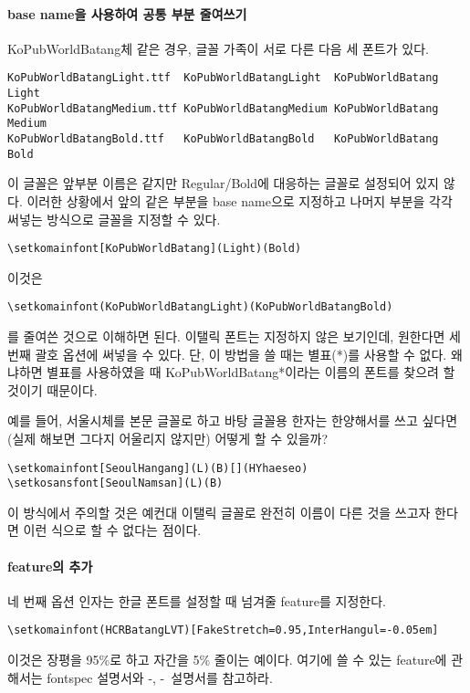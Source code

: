 \documentclass[
	12pt,
	a4paper,
	kosection,
	footnote,
	nobookmarks,
	microtype,
]{oblivoir}
\def\xetexko{\XeTeX-\ko}
\def\luatexko{\LuaTeX-\ko}
\begin{document}
\paragraph{base name을 사용하여 공통 부분 줄여쓰기}
KoPubWorldBatang체 같은 경우, 글꼴 가족이 서로 다른 다음 세 폰트가 있다.
\begin{verbatim}
KoPubWorldBatangLight.ttf  KoPubWorldBatangLight  KoPubWorldBatang Light
KoPubWorldBatangMedium.ttf KoPubWorldBatangMedium KoPubWorldBatang Medium
KoPubWorldBatangBold.ttf   KoPubWorldBatangBold   KoPubWorldBatang Bold
\end{verbatim}
이 글꼴은 앞부분 이름은 같지만 Regular/Bold에 대응하는 글꼴로 설정되어 있지 않다.
이러한 상황에서 앞의 같은 부분을 base name으로 지정하고 나머지 부분을 각각 써넣는 방식으로 
글꼴을 지정할 수 있다.
\begin{verbatim}
\setkomainfont[KoPubWorldBatang](Light)(Bold)
\end{verbatim}
이것은
\begin{verbatim}
\setkomainfont(KoPubWorldBatangLight)(KoPubWorldBatangBold)
\end{verbatim}
를 줄여쓴 것으로 이해하면 된다. 이탤릭 폰트는 지정하지 않은 보기인데, 원한다면 세번째 괄호 옵션에
써넣을 수 있다. 단, 이 방법을 쓸 때는 별표(*)를 사용할 수 없다. 왜냐하면 별표를 사용하였을 때
KoPubWorldBatang*이라는 이름의 폰트를 찾으려 할 것이기 때문이다.

예를 들어, 서울시체를 본문 글꼴로 하고 바탕 글꼴용 한자는 한양해서를 쓰고 싶다면(실제 해보면 그다지 어울리지 않지만) 어떻게 할 수 있을까?
\begin{verbatim}
\setkomainfont[SeoulHangang](L)(B)[](HYhaeseo)
\setkosansfont[SeoulNamsan](L)(B)
\end{verbatim}

이 방식에서 주의할 것은 예컨대 이탤릭 글꼴로 완전히 이름이 다른 것을 쓰고자 한다면
이런 식으로 할 수 없다는 점이다.

\paragraph{feature의 추가}
네 번째 옵션 인자는 한글 폰트를 설정할 때 넘겨줄 feature를 지정한다.
\begin{verbatim}
\setkomainfont(HCRBatangLVT)[FakeStretch=0.95,InterHangul=-0.05em]
\end{verbatim}
이것은 장평을 95\%로 하고 자간을 5\% 줄이는 예이다. 여기에 쓸 수 있는 feature에 관해서는
fontspec 설명서와 \xetexko, \luatexko\ 설명서를 참고하라.
\end{document}
